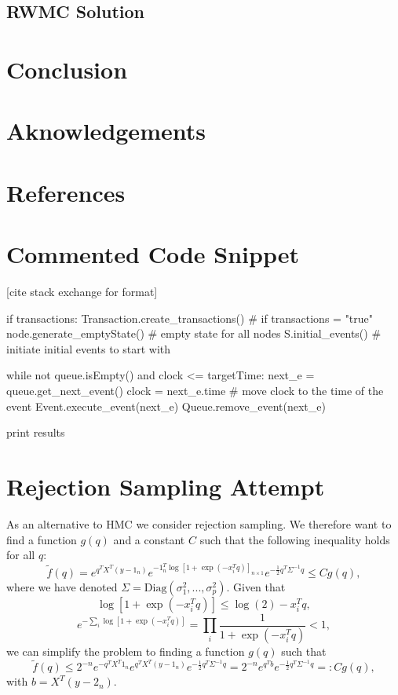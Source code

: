 \documentclass[a4paper, 12pt,oneside]{article}
\begin{document}
		\subsection{RWMC Solution}
	\section{Conclusion}
	\section*{Aknowledgements}
	\section*{References}
	\appendix
		\section{Commented Code Snippet}\label{appendix:commented-code-snippet}
			[cite stack exchange for format]
			\begin{python}
			if transactions: Transaction.create_transactions() # if transactions = "true"
			node.generate_emptyState() # empty state for all nodes
			S.initial_events() # initiate initial events to start with

			while not queue.isEmpty() and clock <= targetTime:
				next_e = queue.get_next_event()
				clock = next_e.time # move clock to the time of the event
				Event.execute_event(next_e)
				Queue.remove_event(next_e)

			print results
			\end{python}
		\section{Rejection Sampling Attempt}\label{appendix:rejection-sampling-attempt}
		As an alternative to HMC we consider rejection sampling. We therefore want to find a function $g(q)$ and a constant $C$ such that the following inequality holds for all $q$:
		\begin{equation}
			\tilde{f}(q) = e^{q^TX^T(y-1_{n})}e^{-1_{n}^T \log[1+\exp(-x_i^Tq)]_{n\times 1}}e^{-\frac{1}{2}q^T\Sigma^{-1} q} \leq Cg(q),
		\end{equation}
		where we have denoted $\Sigma=\text{Diag}(\sigma_1^2,...,\sigma_p^2)$.
		Given that 
		\begin{equation}
			\log[1+\exp(-x_i^Tq)] \le \log(2) - x_i^Tq,
		\end{equation}
		\begin{equation}
			e^{-\sum_i \log[1+\exp(-x_i^Tq)]} = \prod_i \frac{1}{1+\exp(-x_i^Tq)}<1,
		\end{equation}
		we can simplify the problem to finding a function $g(q)$ such that
		\begin{equation}
			\tilde{f}(q) \le 2^{-n}e^{-q^TX^T 1_n} e^{q^TX^T(y-1_{n})}e^{-\frac{1}{2}q^T\Sigma^{-1} q} = 2^{-n}e^{q^Tb}e^{-\frac{1}{2}q^T\Sigma^{-1} q}
			=: Cg(q),
		\end{equation}
		with $b=X^T(y-2_{n})$. 
	
\end{document}
